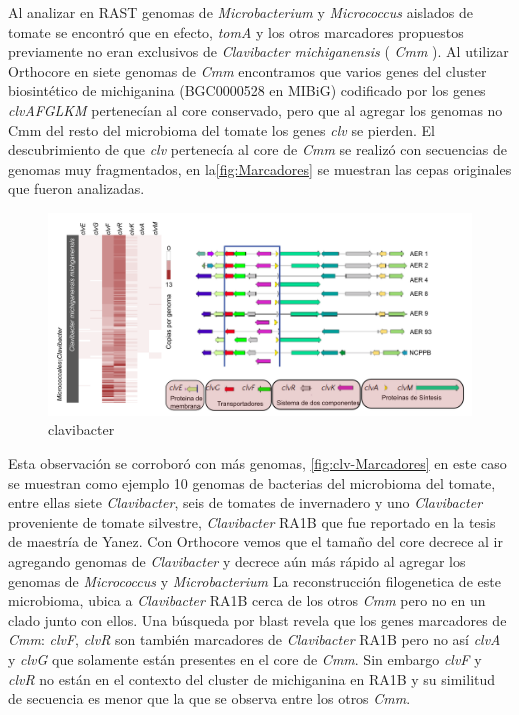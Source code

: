 \documentclass[12pt,twoside]{reedthesis}
\begin{document}
  Al analizar en RAST genomas de \emph{Microbacterium} y
  \emph{Micrococcus} aislados de tomate se encontró que en efecto,
  \emph{tomA} y los otros marcadores propuestos previamente no eran
  exclusivos de \emph{Clavibacter michiganensis} ( \emph{Cmm} ). Al
  utilizar Orthocore en siete genomas de \emph{Cmm} encontramos que varios
  genes del cluster biosintético de michiganina (BGC0000528 en MIBiG)
  codificado por los genes \emph{clvAFGLKM} pertenecían al core
  conservado, pero que al agregar los genomas no Cmm del resto del
  microbioma del tomate los genes \emph{clv} se pierden. El descubrimiento
  de que \emph{clv} pertenecía al core de \emph{Cmm} se realizó con
  secuencias de genomas muy fragmentados, en la\autoref{fig:Marcadores} se
  muestran las cepas originales que fueron analizadas.
  
  \begin{figure}[h!tbp]
  \centering
  \includegraphics[angle = 0,scale = .6]{chapter1/clv.png}
  \caption[ clv BGC]{\footnotesize{clavibacter}}
  \label{fig:clv-Marcadores}
  \end{figure}
  
  Esta observación se corroboró con más genomas,
  \autoref{fig:clv-Marcadores} en este caso se muestran como ejemplo 10
  genomas de bacterias del microbioma del tomate, entre ellas siete
  \emph{Clavibacter}, seis de tomates de invernadero y uno
  \emph{Clavibacter} proveniente de tomate silvestre, \emph{Clavibacter}
  RA1B que fue reportado en la tesis de maestría de Yanez. Con Orthocore
  vemos que el tamaño del core decrece al ir agregando genomas de
  \emph{Clavibacter} y decrece aún más rápido al agregar los genomas de
  \emph{Micrococcus} y \emph{Microbacterium} La reconstrucción
  filogenetica de este microbioma, ubica a \emph{Clavibacter} RA1B cerca
  de los otros \emph{Cmm} pero no en un clado junto con ellos. Una
  búsqueda por blast revela que los genes marcadores de \emph{Cmm}:
  \emph{clvF}, \emph{clvR} son también marcadores de \emph{Clavibacter}
  RA1B pero no así \emph{clvA} y \emph{clvG} que solamente están presentes
  en el core de \emph{Cmm}. Sin embargo \emph{clvF} y \emph{clvR} no están
  en el contexto del cluster de michiganina en RA1B y su similitud de
  secuencia es menor que la que se observa entre los otros \emph{Cmm}.
  
\end{document}
